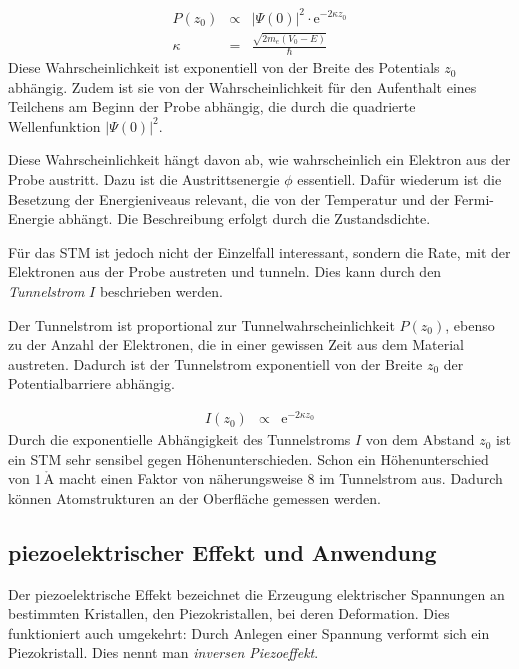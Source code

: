 \documentclass[12pt,a4paper]{scrartcl}
\numberwithin{equation}{section} %
\begin{document}
\begin{eqnarray}
    P(z_0) &\propto& |\Psi(0)|^2 \cdot \mathrm e^{-2\kappa z_0} \\
    \kappa &=& \frac{\sqrt{2m_e(V_0 - E)}}{\hbar} \label{kappa}
\end{eqnarray}
Diese Wahrscheinlichkeit ist exponentiell von der Breite des
Potentials $z_0$ abhängig. Zudem ist sie von der Wahrscheinlichkeit
für den Aufenthalt eines Teilchens am Beginn der Probe abhängig, die
durch die quadrierte Wellenfunktion $|\Psi(0)|^2$.

Diese Wahrscheinlichkeit hängt davon ab, wie wahrscheinlich ein Elektron
aus der Probe austritt. Dazu ist die Austrittsenergie $\phi$
essentiell. Dafür wiederum ist die Besetzung der Energieniveaus
relevant, die von der Temperatur und der Fermi-Energie abhängt. Die
Beschreibung erfolgt durch die Zustandsdichte.

Für das STM ist jedoch nicht der Einzelfall interessant, sondern die
Rate, mit der Elektronen aus der Probe austreten und tunneln. Dies kann
durch den \emph{Tunnelstrom} $I$ beschrieben werden.

Der Tunnelstrom ist proportional zur Tunnelwahrscheinlichkeit
$P(z_0)$, ebenso zu der Anzahl der Elektronen, die in einer gewissen
Zeit aus dem Material austreten. Dadurch ist der Tunnelstrom
exponentiell von der Breite $z_0$ der Potentialbarriere abhängig.

\begin{eqnarray}
    I(z_0) &\propto& \mathrm e^{-2\kappa z_0} \label{I(z)}
\end{eqnarray}
Durch die exponentielle Abhängigkeit des Tunnelstroms $I$ von dem
Abstand $z_0$ ist ein STM sehr sensibel gegen Höhenunterschieden.
Schon ein Höhenunterschied von $1\,\mathrm{\mathring{A}}$ macht einen
Faktor von näherungsweise $8$ im Tunnelstrom aus. \cite{Anleitung} Dadurch
können Atomstrukturen an der Oberfläche gemessen werden.

\hypertarget{piezoelektrischer-effekt-und-anwendung}{%
\subsection{piezoelektrischer Effekt und
Anwendung}\label{piezoelektrischer-effekt-und-anwendung}}

Der piezoelektrische Effekt bezeichnet die Erzeugung elektrischer
Spannungen an bestimmten Kristallen, den Piezokristallen, bei deren
Deformation. Dies funktioniert auch umgekehrt: Durch Anlegen einer
Spannung verformt sich ein Piezokristall. Dies nennt man \emph{inversen
Piezoeffekt}.
\end{document}
